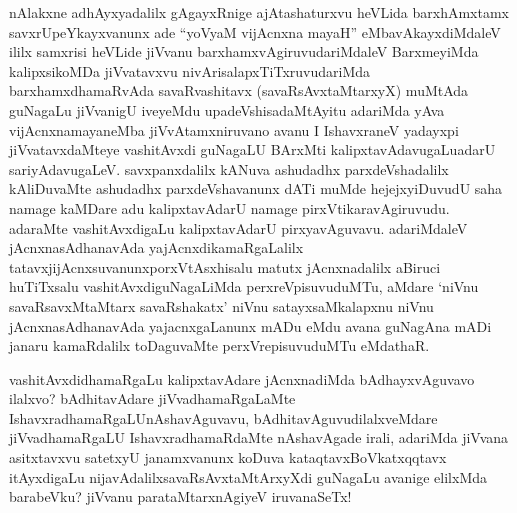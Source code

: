 
\begin{artha}
nAlakxne adhAyxyadalilx gAgayxRnige ajAtashaturxvu heVLida barxhAmxtamx savxrUpeYkayxvanunx ade ``yoV\s yaM vijAcnxna mayaH'' eMba\break vAkayxdiMdaleV ililx samxrisi heVLide jiVvanu barxhamxvAgiruvudariMdaleV BarxmeyiMda kalipxsikoMDa jiVvatavxvu nivArisalapxTiTxruvudariMda barxhamxdhamaRvAda savaRvashitavx (savaRsAvxtaMtarxyX) muMtAda guNagaLu jiVvanigU iveyeMdu upadeVshisadaMtAyitu adariMda yAva vijAcnxnamayaneMba jiVvAtamxniruvano avanu I IshavxraneV yadayxpi jiVvatavxdaMteye vashitAvxdi guNagaLU BArxMti kalipxtavAdavugaLu\break adarU sariyAdavugaLeV. savxpanxdalilx kANuva ashudadhx parxdeVshadalilx kAliDuvaMte ashudadhx parxdeVshavanunx dATi muMde hejejxyiDuvudU saha namage kaMDare adu kalipxtavAdarU namage pirxVtikaravAgiruvudu. adaraMte vashitAvxdigaLu kalipxtavAdarU pirxyavAguvavu. adariMdaleV jAcnxnasAdhanavAda yajAcnxdikamaRgaLalilx tatavxjijAcnxsuvanunx\break porxVtAsxhisalu matutx jAcnxnadalilx aBiruci huTiTxsalu vashitAvxdiguNagaLiMda perxreVpisuvuduMTu, aMdare `niVnu savaRsavxMtaMtarx savaRshakatx' niVnu satayxsaMkalapxnu niVnu jAcnxnasAdhanavAda yajacnxgaLanunx mADu eMdu avana guNagAna mADi janaru kamaRdalilx toDaguvaMte perxVrepisuvuduMTu eMdathaR.
\end{artha}


\begin{artha}
vashitAvxdidhamaRgaLu kalipxtavAdare jAcnxnadiMda bAdhayxvAguvavo ilalxvo? bAdhitavAdare jiVvadhamaRgaLaMte IshavxradhamaRgaLU\break nAshavAguvavu, bAdhitavAguvudilalxveMdare jiVvadhamaRgaLU IshavxradhamaRdaMte nAshavAgade irali, adariMda jiVvana asitxtavxvu satetxyU janamxvanunx koDuva kataqtavxBoVkatxqqtavx itAyxdigaLu nijavAdalilx\break savaRsAvxtaMtArxyXdi guNagaLu avanige elilxMda barabeVku? jiVvanu parataMtarxnAgiyeV iruvanaSeTx!
\end{artha}

